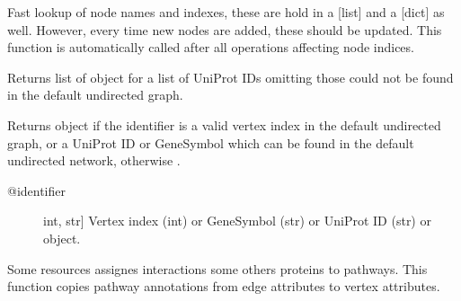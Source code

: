 \documentclass[letterpaper,10pt,english]{sphinxmanual}
\begin{document}
\begin{fulllineitems}
\begin{fulllineitems}
\end{fulllineitems}


\begin{fulllineitems}
\label{\detokenize{main:pypath.main.PyPath.update_vname}}
Fast lookup of node names and indexes, these are hold in a
{[}list{]} and a {[}dict{]} as well. However, every time new nodes are
added, these should be updated. This function is automatically
called after all operations affecting node indices.

\end{fulllineitems}


\begin{fulllineitems}
\label{\detokenize{main:pypath.main.PyPath.ups}}
Returns list of  object
for a list of UniProt IDs omitting those
could not be found in the default
undirected graph.

\end{fulllineitems}


\begin{fulllineitems}
\label{\detokenize{main:pypath.main.PyPath.v}}
Returns  object if the identifier
is a valid vertex index in the default undirected graph,
or a UniProt ID or GeneSymbol which can be found in the
default undirected network, otherwise .
\begin{description}
\item[{@identifier}] \leavevmode{[}int, str{]}
Vertex index (int) or GeneSymbol (str) or UniProt ID (str) or
 object.

\end{description}

\end{fulllineitems}


\begin{fulllineitems}
\label{\detokenize{main:pypath.main.PyPath.vertex_pathways}}
Some resources assignes interactions some others proteins to
pathways. This function copies pathway annotations from edge
attributes to vertex attributes.


\end{fulllineitems}
\end{fulllineitems}
\end{document}
